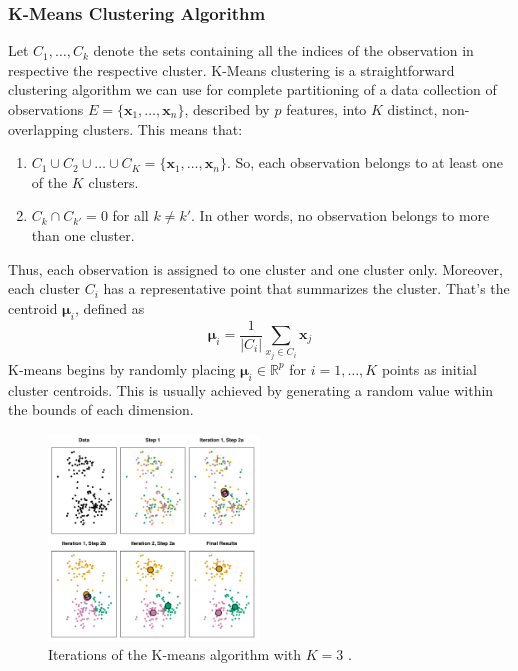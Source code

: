 \subsubsection{K-Means Clustering Algorithm}
\label{sss:kmeans}
Let $C_1,\dots,C_k$ denote the sets containing all the indices of the observation in respective the respective cluster. K-Means clustering is a straightforward clustering algorithm we can use for complete partitioning of a data collection of observations $E=\{\mathbf{x}_1, \dots, \mathbf{x}_n \}$, described by $p$ features, into $K$ distinct, non-overlapping clusters. This means that:
\begin{enumerate}
    \item $C_1 \cup C_2 \cup \dots \cup C_K=\{\mathbf{x}_1, \dots, \mathbf{x}_n\}$. So, each observation belongs to at least one of the $K$ clusters.
    \item $C_k\cap C_{k'}=0$ for all $k\neq k'$. In other words, no observation belongs to more than one cluster.
\end{enumerate}
Thus, each observation is assigned to one cluster and one cluster only. Moreover, each cluster $C_i$ has a representative point that summarizes the cluster. That's the centroid $\bm{\mu}_i$, defined as
\begin{equation}
    \label{eq:centroid}
    \boldsymbol{\mu}_i=\frac{1}{\left|C_i\right|} \sum_{x_j \in C_i} \mathbf{x}_j
\end{equation}
K-means begins by randomly placing $\bm{\mu}_i \in \mathbb{R}^p$ for $i=1,\dots,K$ points as initial cluster centroids. This is usually achieved by generating a random value within the bounds of each dimension. 
\begin{figure}
    \centering
    \includegraphics[width=0.5\textwidth]{Images/clustiteration.png}
    \caption[K-Means clustering iterations.]{Iterations of the K-means algorithm with $K=3$ \cite{james_introduction_2021}.}
    \label{fig:clustiteration}
\end{figure}
